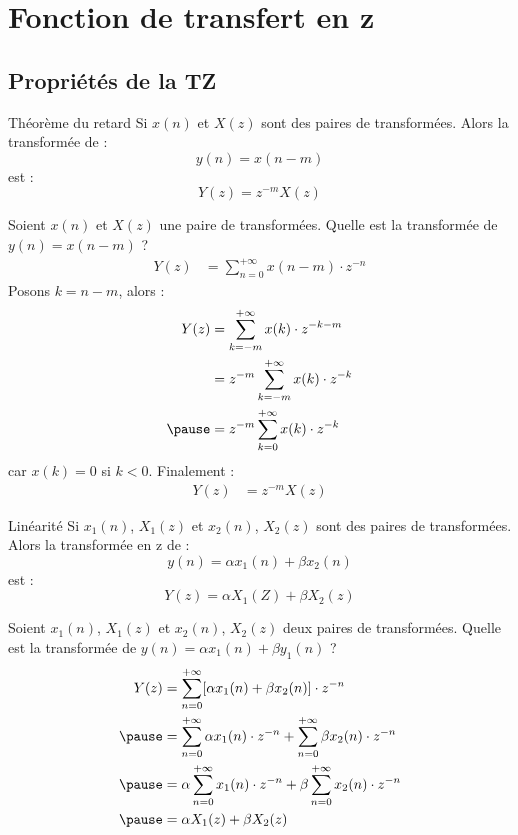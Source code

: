 \documentclass[a4paper,11pt]{beamer}
\begin{document}
\section[Fct. de trsf. en z]{Fonction de transfert en z}
\subsection{Propriétés de la TZ}
\begin{frame}
\begin{block}{Théorème du retard}
\justifying
Si $x(n)$ et $X(z)$ sont des paires de transformées. Alors la transformée de :
$$
y(n)=x(n-m)
$$
est :
$$
Y(z) = z^{-m}X(z)
$$
\end{block}
\end{frame}

\begin{frame}
\justifying
Soient $x(n)$ et $X(z)$ une paire de transformées. Quelle est la transformée de
$y(n)=x(n-m)$ ?
$$
\begin{aligned}
Y(z) &= \sum_{n=0}^{+\infty}x(n-m)\cdot z^{-n}
\end{aligned}
$$
\pause
Posons $k=n-m$, alors :
$$
\begin{aligned}
Y(z) &= \sum_{k=-m}^{+\infty}x(k)\cdot z^{-k-m}\\
	 &= z^{-m}\sum_{k=-m}^{+\infty}x(k)\cdot z^{-k}\\
\pause
	 &= z^{-m}\sum_{k=0}^{+\infty}x(k)\cdot z^{-k}
\end{aligned}
$$
car $x(k)=0$ si $k<0$. Finalement :
\pause
$$
\begin{aligned}
Y(z) &= z^{-m}X(z)
\end{aligned}
$$
\end{frame}

\begin{frame}
\begin{block}{Linéarité}
\justifying 
Si $x_1(n)$, $X_1(z)$ et $x_2(n)$, $X_2(z)$ sont des paires de transformées.
Alors la transformée en z de :
$$
y(n)=\alpha x_1(n) + \beta x_2(n)
$$
est :
$$
Y(z)= \alpha X_1(Z) + \beta X_2(z)
$$
\end{block}
\end{frame}

\begin{frame}
\justifying
Soient $x_1(n)$, $X_1(z)$ et $x_2(n)$, $X_2(z)$ deux paires de transformées.
Quelle est la transformée de $y(n)=\alpha x_1(n) + \beta y_1(n)$ ?
$$
\begin{aligned}
Y(z) &= \sum_{n=0}^{+\infty}[\alpha x_1(n) + \beta x_2(n)]\cdot z^{-n}\\
\pause
     &= \sum_{n=0}^{+\infty}\alpha x_1(n)\cdot z^{-n} +
        \sum_{n=0}^{+\infty}\beta x_2(n)\cdot z^{-n}\\
\pause
     &= \alpha\sum_{n=0}^{+\infty} x_1(n)\cdot z^{-n} +
        \beta\sum_{n=0}^{+\infty} x_2(n)\cdot z^{-n}\\
\pause
     &= \alpha X_1(z) + \beta X_2(z)
\end{aligned}
$$
\end{frame}
\end{document}
